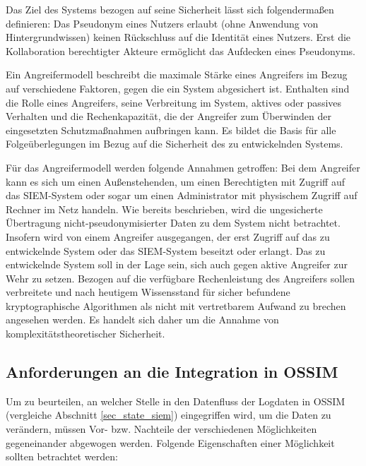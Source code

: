 Das Ziel des Systems bezogen auf seine Sicherheit lässt sich folgendermaßen definieren: Das Pseudonym eines Nutzers erlaubt (ohne Anwendung von Hintergrundwissen) keinen Rückschluss auf die Identität eines Nutzers. Erst die Kollaboration berechtigter Akteure ermöglicht das Aufdecken eines Pseudonyms.

Ein Angreifermodell beschreibt die maximale Stärke eines Angreifers im Bezug auf verschiedene Faktoren, gegen die ein System abgesichert ist. Enthalten sind die Rolle eines Angreifers, seine Verbreitung im System, aktives oder passives Verhalten und die Rechenkapazität, die der Angreifer zum Überwinden der eingesetzten Schutzmaßnahmen aufbringen kann. Es bildet die Basis für alle Folgeüberlegungen im Bezug auf die Sicherheit des zu entwickelnden Systems.

Für das Angreifermodell werden folgende Annahmen getroffen: Bei dem Angreifer kann es sich um einen Außenstehenden, um einen Berechtigten mit Zugriff auf das SIEM-System oder sogar um einen Administrator mit physischem Zugriff auf Rechner im Netz handeln. Wie bereits beschrieben, wird die ungesicherte Übertragung nicht-pseudonymisierter Daten zu dem System nicht betrachtet. Insofern wird von einem Angreifer ausgegangen, der erst Zugriff auf das zu entwickelnde System oder das SIEM-System beseitzt oder erlangt. Das zu entwickelnde System soll in der Lage sein, sich auch gegen aktive Angreifer zur Wehr zu setzen. 
Bezogen auf die verfügbare Rechenleistung des Angreifers sollen verbreitete und nach heutigem Wissensstand für sicher befundene kryptographische Algorithmen als nicht mit vertretbarem Aufwand zu brechen angesehen werden. Es handelt sich daher um die Annahme von komplexitätstheoretischer Sicherheit.


\subsection{Anforderungen an die Integration in OSSIM}

\label{subsec_impl_requirements_ossimintegration}

Um zu beurteilen, an welcher Stelle in den Datenfluss der Logdaten in OSSIM (vergleiche Abschnitt \ref{sec_state_siem}) eingegriffen wird, um die Daten zu verändern, müssen Vor- bzw. Nachteile der verschiedenen Möglichkeiten gegeneinander abgewogen werden. Folgende Eigenschaften einer Möglichkeit sollten betrachtet werden:

